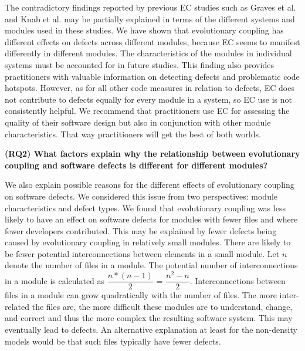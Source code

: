 \documentclass[times]{smrauth}
\begin{document}
The contradictory findings reported by previous EC studies such as Graves et al. \cite{graves2000predicting} and Knab et al. \cite{knab2006predicting} may be partially explained in terms of the different systems and modules used in these studies. We have shown that evolutionary coupling has different effects on defects across different modules, because EC seems to manifest differently in different modules. The characteristics of the modules in individual systems must be accounted for in future studies. This finding also provides practitioners with valuable information on detecting defects and problematic code hotspots. However, as for all other code measures in relation to defects, EC does not contribute to defects equally for every module in a system, so EC use is not consistently helpful. We recommend that practitioners use EC for assessing the quality of their software design but also in conjunction with other module characteristics. That way practitioners will get the best of both worlds.



\textbf{(RQ2) What factors explain why the relationship between evolutionary coupling and software defects is different for different modules?}

We also explain possible reasons for the different effects of evolutionary coupling on software defects. We considered this issue from two perspectives: module characteristics and defect types. We found that evolutionary coupling was less likely to have an effect on software defects for modules with fewer files and where fewer developers contributed. This may be explained by fewer defects being caused by evolutionary coupling in relatively small modules. There are likely to be fewer potential interconnections between elements in a small module. Let $n$ denote the number of files in a module. The potential number of interconnections in a module is calculated as $ \dfrac{n*(n-1)} {2}$ = $ \dfrac{n^2-n} {2}$. Interconnections between files in a module can grow quadratically with the number of files. The more inter-related the files are, the more difficult these modules are to understand, change, and correct and thus the more complex the resulting software system. This may eventually lead to defects. An alternative explanation at least for the non-density models would be that such files typically have fewer defects. %
\end{document}
